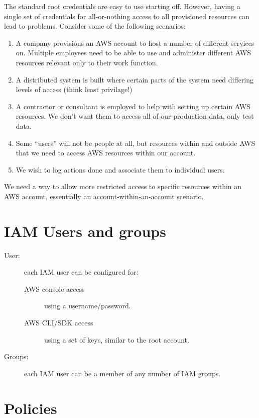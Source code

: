 The standard root credentials are easy to use starting off. However,
having a single set of credentials for all-or-nothing access to all
provisioned resources can lead to problems. Consider some of the
following scenarios:

\begin{enumerate}
\def\labelenumi{\arabic{enumi}.}
\item
  A company provisions an AWS account to host a number of different
  services on. Multiple employees need to be able to use and administer
  different AWS resources relevant only to their work function.
\item
  A distributed system is built where certain parts of the system need
  differing levels of access (think least privilage!)
\item
  A contractor or consultant is employed to help with setting up certain
  AWS resources. We don't want them to access all of our production
  data, only test data.
\item
  Some ``users'' will not be people at all, but resources within and
  outside AWS that we need to access AWS resources within our account.
\item
  We wish to log actions done and associate them to individual users.
\end{enumerate}

We need a way to allow more restricted access to specific resources
within an AWS account, essentially an account-within-an-account
scenario.

\section{IAM Users and groups}\label{iam-users-and-groups}

\begin{description}
\item[User:]
each IAM user can be configured for:

\begin{description}
\item[AWS console access]
using a username/password.
\item[AWS CLI/SDK access]
using a set of keys, similar to the root account.
\end{description}
\item[Groups:]
each IAM user can be a member of any number of IAM groups.
\end{description}


\section{Policies}\label{policies}

